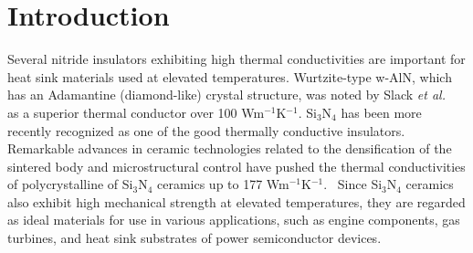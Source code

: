 \documentclass[twocolumn,amsmath,amssymb,a4paper,prb,superscriptaddress,floatfix]{revtex4-1}
\begin{document}
\maketitle

\section{Introduction}
Several nitride insulators exhibiting high thermal conductivities are important
for heat sink materials used at elevated temperatures. Wurtzite-type w-AlN,
which has an Adamantine (diamond-like) crystal structure, was noted by Slack
{\it et al.}~\cite{slack} as a superior thermal conductor over 100 Wm$^{-1}$K$^{-1}$.
Si$_3$N$_4$ has been more recently recognized as one of the good thermally
conductive insulators. Remarkable advances in ceramic technologies related to
the densification of the sintered body and microstructural control have pushed
the thermal conductivities of polycrystalline of Si$_3$N$_4$ ceramics up to 177
Wm$^{-1}$K$^{-1}$.~\cite{zhou,hirao,watari,hirosaki} Since Si$_3$N$_4$ ceramics
also exhibit high mechanical strength at elevated temperatures, they are
regarded as ideal materials for use in various applications, such as engine components,
gas turbines, and heat sink substrates of power semiconductor devices.
\end{document}
